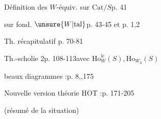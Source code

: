 Définition des $W$-équiv. sur $\mathrm{Cat}/S$\qquad p. 41

 sur  fond. $\unsure{W|\mathrm{tal}}$\qquad p. 43-45 et p. 1,2

Th. récapitulatif \qquad p. 70-81

Th.-scholie 2\qquad p. 108-113\qquad avec $\mathrm{Ho}_W^{\mathrm{lc}}(S),\mathrm{Ho}_{W_0}(S)$

beaux diagrammes :\qquad p. 8,,175

Nouvelle version théorie HOT :\qquad p. 171-205

(résumé de la situation)

